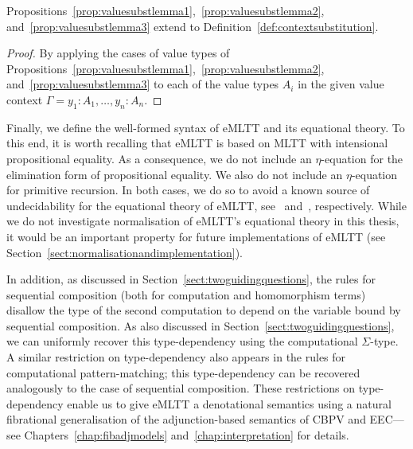 \begin{proposition}
\label{prop:contextsubstlemma}
Propositions~\ref{prop:valuesubstlemma1},~\ref{prop:valuesubstlemma2}, and~\ref{prop:valuesubstlemma3} extend to Definition~\ref{def:contextsubstitution}.
\end{proposition}

\begin{proof}
By applying the cases of value types of Propositions~\ref{prop:valuesubstlemma1},~\ref{prop:valuesubstlemma2}, and~\ref{prop:valuesubstlemma3} to each of the value types $A_i$ in the given value context $\Gamma = y_1 \!:\! A_1, \ldots, y_n \!:\! A_n$.
\end{proof}


Finally, we define the well-formed syntax of eMLTT and its equational theory.
To this end, it is worth recalling that eMLTT is based on MLTT with intensional propositional equality. As a consequence, we do not include an $\eta$-equation for the elimination form of propositional equality. 
We also do not include an $\eta$-equation for primitive recursion. In both cases, we do so to avoid a known source of undecidability for the equational theory of eMLTT, see~\cite{Hofmann:Thesis} and~\cite{Okada:Rewriting}, respectively. While we do not investigate normalisation of eMLTT's equational theory in this thesis, it would be an important property for future implementations of eMLTT (see Section~\ref{sect:normalisationandimplementation}). 

In addition, as discussed in Section~\ref{sect:twoguidingquestions}, the rules for sequential composition (both for computation and homomorphism terms) disallow the type of the second computation to depend on the variable bound by sequential composition. As also discussed in Section~\ref{sect:twoguidingquestions}, we can uniformly recover this type-dependency using the computational $\Sigma$-type. A similar restriction on type-dependency also appears in the rules for computational pattern-matching; this type-dependency can be recovered analogously to the case of sequential composition. These restrictions on type-dependency enable us to give eMLTT a denotational semantics using a natural fibrational generalisation of the adjunction-based semantics of CBPV and EEC---see Chapters~\ref{chap:fibadjmodels} and~\ref{chap:interpretation} for details.



